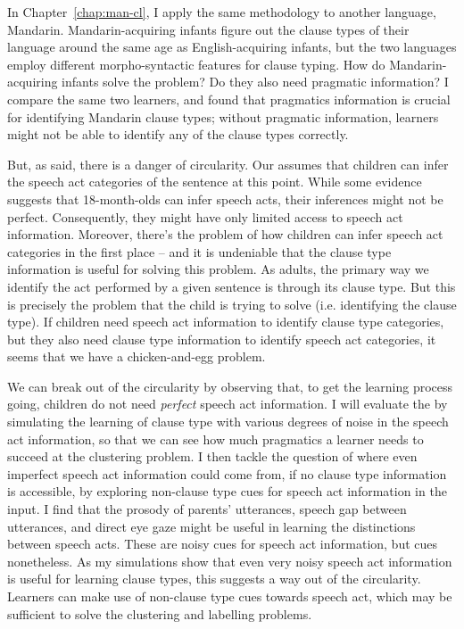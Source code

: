 In Chapter~\ref{chap:man-cl}, I apply the same methodology to another language, Mandarin. Mandarin-acquiring infants figure out the clause types of their language around the same age as English-acquiring infants, but the two languages employ different morpho-syntactic features for clause typing. How do Mandarin-acquiring infants solve the problem? Do they also need pragmatic information? I compare the same two learners, and found that pragmatics information is crucial for identifying Mandarin clause types; without pragmatic information, learners might not be able to identify any of the clause types correctly.

But, as said, there is a danger of circularity.
Our \hypos{} assumes that children can infer the speech act categories of the sentence at this point. While some evidence suggests that 18-month-olds can infer speech acts, their inferences might not be perfect. Consequently, they might have only limited access to speech act information. Moreover, there's the problem of how children can infer speech act categories in the first place -- and it is undeniable that the clause type information is useful for solving this problem. As adults, the primary way we identify the act performed by a given sentence is through its clause type. But this is precisely the problem that the child is trying to solve (i.e. identifying the clause type). If children need speech act information to identify clause type categories, but they also need clause type information to identify speech act categories, it seems that we have a chicken-and-egg problem. 

We can break out of the circularity by observing that, to get the learning process going, children do not need \emph{perfect} speech act information. I will evaluate the \hypos{} by 
simulating the learning of clause type with various degrees of noise in the speech act information, so that we can see how much pragmatics a learner needs to succeed at the clustering problem. I then tackle the question of where even imperfect speech act information could come from, if no clause type information is accessible,
by exploring non-clause type cues for speech act information in the input. I find that the prosody of parents' utterances, speech gap between utterances, and direct eye gaze might be useful in learning the distinctions between speech acts.
These are noisy cues for speech act information, but cues nonetheless. As my simulations show that even very noisy speech act information is useful for learning clause types, this suggests a way out of the circularity. Learners can make use of non-clause type cues towards speech act, which may be sufficient to solve the clustering and labelling problems.

